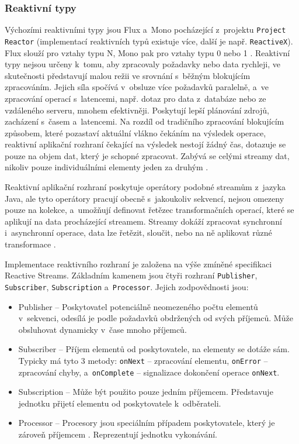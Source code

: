 \subsubsection{Reaktivní typy}
Výchozími reaktivními typy jsou Flux a~Mono pocházející z~projektu \texttt{Project Reactor} (implementací reaktivních typů existuje více, další je např. \texttt{ReactiveX}). Flux slouží pro vztahy typu N, Mono pak pro vztahy typu 0 nebo 1 \cite{projectReactor}.
Reaktivní typy nejsou určeny k~tomu, aby zpracovaly požadavky nebo data rychleji, ve skutečnosti představují malou režii ve srovnání s~běžným blokujícím zpracováním. Jejich síla spočívá v~obsluze více požadavků paralelně, a~ve zpracování operací s~latencemi, např. dotaz pro data z~databáze nebo ze vzdáleného serveru, mnohem efektivněji. Poskytují lepší plánování zdrojů, zacházení s~časem a~latencemi. Na rozdíl od tradičního zpracování blokujícím způsobem, které pozastaví aktuální vlákno čekáním na výsledek operace, reaktivní aplikační rozhraní čekající na výsledek nestojí žádný čas, dotazuje se pouze na objem dat, který je schopné zpracovat. Zabývá se celými streamy dat, nikoliv pouze individuálními elementy jeden za druhým \cite{springReactiveTypes}.

Reaktivní aplikační rozhraní poskytuje operátory podobné streamům z~jazyka Java, ale tyto operátory pracují obecně s~jakoukoliv sekvencí, nejsou omezeny pouze na kolekce, a~umožňují definovat řetězec transformačních operací, které se aplikují na data procházející streamem. Streamy dokáží zpracovat synchronní i~asynchronní operace, data lze řetězit, sloučit, nebo na ně aplikovat různé transformace \cite{springReactiveTypes}.

Implementace reaktivního rozhraní je založena na výše zmíněné specifikaci Reactive Streams. Základním kamenem jsou čtyři rozhraní \texttt{Publisher}, \texttt{Subscriber}, \texttt{Subscription} a~\texttt{Processor}. Jejich zodpovědnosti jsou:
\begin{itemize}
    \item Publisher -- Poskytovatel potenciálně neomezeného počtu elementů v~sekvenci, odesílá je podle požadavků obdržených od svých příjemců. Může obsluhovat dynamicky v~čase mnoho příjemců.
    
    \item Subscriber -- Příjem elementů od poskytovatele, na elementy se dotáže sám. Typicky má tyto 3 metody: \texttt{onNext} -- zpracování elementu, \texttt{onError} -- zpracování chyby, a~\texttt{onComplete} -- signalizace dokončení operace \texttt{onNext}.
    
    \item Subscription -- Může být použito pouze jedním příjemcem. Představuje jednotku přijetí elementu od poskytovatele k~odběrateli.
    
    \item Processor -- Procesory jsou speciálním případem poskytovatele, který je zároveň příjemcem \cite{reactoreRefGuide}. Reprezentují jednotku vykonávání.
\end{itemize}

